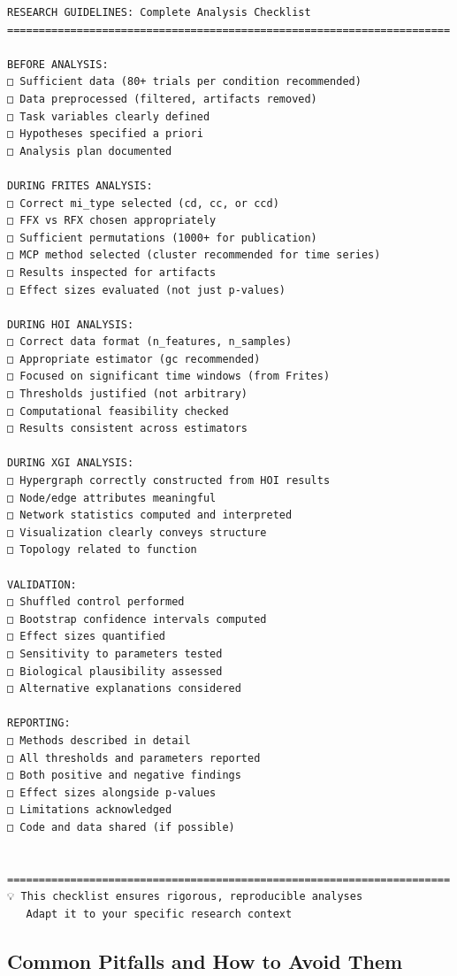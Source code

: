 \documentclass[
  11pt,
  letterpaper,
  oneside,
  openany]{book}
\begin{document}
\begin{verbatim}
RESEARCH GUIDELINES: Complete Analysis Checklist
======================================================================

BEFORE ANALYSIS:
□ Sufficient data (80+ trials per condition recommended)
□ Data preprocessed (filtered, artifacts removed)
□ Task variables clearly defined
□ Hypotheses specified a priori
□ Analysis plan documented

DURING FRITES ANALYSIS:
□ Correct mi_type selected (cd, cc, or ccd)
□ FFX vs RFX chosen appropriately
□ Sufficient permutations (1000+ for publication)
□ MCP method selected (cluster recommended for time series)
□ Results inspected for artifacts
□ Effect sizes evaluated (not just p-values)

DURING HOI ANALYSIS:
□ Correct data format (n_features, n_samples)
□ Appropriate estimator (gc recommended)
□ Focused on significant time windows (from Frites)
□ Thresholds justified (not arbitrary)
□ Computational feasibility checked
□ Results consistent across estimators

DURING XGI ANALYSIS:
□ Hypergraph correctly constructed from HOI results
□ Node/edge attributes meaningful
□ Network statistics computed and interpreted
□ Visualization clearly conveys structure
□ Topology related to function

VALIDATION:
□ Shuffled control performed
□ Bootstrap confidence intervals computed
□ Effect sizes quantified
□ Sensitivity to parameters tested
□ Biological plausibility assessed
□ Alternative explanations considered

REPORTING:
□ Methods described in detail
□ All thresholds and parameters reported
□ Both positive and negative findings
□ Effect sizes alongside p-values
□ Limitations acknowledged
□ Code and data shared (if possible)


======================================================================
💡 This checklist ensures rigorous, reproducible analyses
   Adapt it to your specific research context
\end{verbatim}

\subsection{Common Pitfalls and How to Avoid
Them}\label{common-pitfalls-and-how-to-avoid-them}
\end{document}
